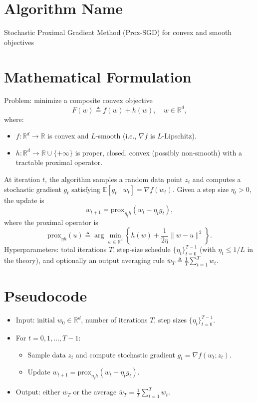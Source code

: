 \documentclass{article}
\newcommand{\prox}{\mathrm{prox}}
\newcommand{\E}{\mathbb{E}}
\newcommand{\R}{\mathbb{R}}
\begin{document}
\section*{Algorithm Name}
Stochastic Proximal Gradient Method (Prox-SGD) for convex and smooth objectives

\section*{Mathematical Formulation}
Problem: minimize a composite convex objective
\[
F(w) \triangleq f(w) + h(w), \quad w \in \R^d,
\]
where:
\begin{itemize}
\item $f:\R^d \to \R$ is convex and $L$-smooth (i.e., $\nabla f$ is $L$-Lipschitz).
\item $h:\R^d \to \R \cup \{+\infty\}$ is proper, closed, convex (possibly non-smooth) with a tractable proximal operator.
\end{itemize}
At iteration $t$, the algorithm samples a random data point $z_t$ and computes a stochastic gradient $g_t$ satisfying $\E[g_t \mid w_t] = \nabla f(w_t)$.
Given a step size $\eta_t>0$, the update is
\[
w_{t+1} = \prox_{\eta_t h}\!\left(w_t - \eta_t g_t\right),
\]
where the proximal operator is
\[
\prox_{\eta h}(u) \triangleq \arg\min_{w \in \R^d}\left\{h(w) + \frac{1}{2\eta}\|w-u\|^2\right\}.
\]
Hyperparameters: total iterations $T$, step-size schedule $\{\eta_t\}_{t=0}^{T-1}$ (with $\eta_t \le 1/L$ in the theory), and optionally an output averaging rule $\bar w_T \triangleq \frac{1}{T}\sum_{t=1}^T w_t$.

\section*{Pseudocode}
\begin{itemize}
\item Input: initial $w_0 \in \R^d$, number of iterations $T$, step sizes $\{\eta_t\}_{t=0}^{T-1}$.
\item For $t=0,1,\dots,T-1$:
\begin{itemize}
\item Sample data $z_t$ and compute stochastic gradient $g_t = \nabla f(w_t; z_t)$.
\item Update $w_{t+1} = \prox_{\eta_t h}(w_t - \eta_t g_t)$.
\end{itemize}
\item Output: either $w_T$ or the average $\bar w_T = \frac{1}{T}\sum_{t=1}^T w_t$.
\end{itemize}
\end{document}
